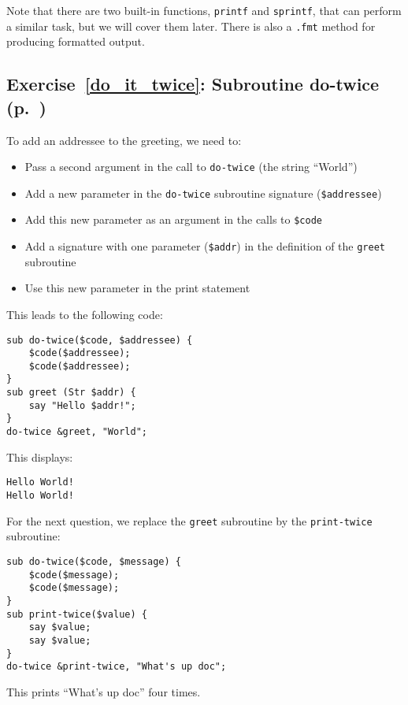 Note that there are two built-in functions, {\tt printf} and 
{\tt sprintf}, that can perform a similar task, but we will 
cover them later. There is also a \verb'.fmt' method for 
producing formatted output.

\subsection{Exercise~\ref{do_it_twice}: Subroutine do-twice (p.~\pageref{do_it_twice})}
\label{sol_do_it_twice}

To add an addressee to the greeting, we need to:
\begin{itemize}
\item Pass a second argument in the call to 
{\tt do-twice} (the string ``World'')
\item Add a new parameter in the {\tt do-twice} subroutine 
signature (\verb'$addressee')
\item Add this new parameter as an argument in the calls 
to \verb'$code'
\item Add a signature with one parameter (\verb'$addr') in 
the definition of the {\tt greet} subroutine 
\item Use this new parameter in the print statement
\end{itemize} 

This leads to the following code:

\begin{verbatim}
sub do-twice($code, $addressee) {
    $code($addressee); 
    $code($addressee);
}
sub greet (Str $addr) {
    say "Hello $addr!";
}
do-twice &greet, "World";
\end{verbatim}

This displays:

\begin{verbatim}
Hello World!
Hello World!
\end{verbatim}

For the next question, we replace the {\tt greet} subroutine 
by the {\tt print-twice} subroutine:

\begin{verbatim}
sub do-twice($code, $message) {
    $code($message); 
    $code($message);
}
sub print-twice($value) {
    say $value;
    say $value;
}
do-twice &print-twice, "What's up doc";
\end{verbatim}

This prints ``What's up doc'' four times.

